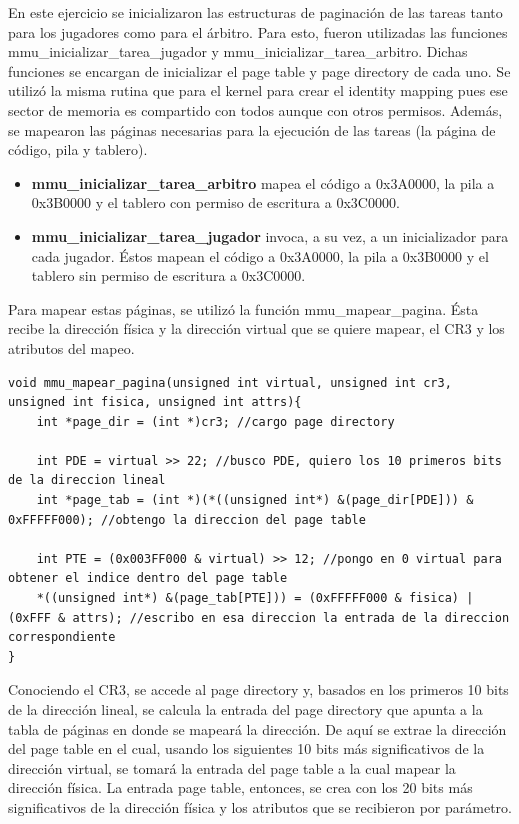\documentclass[10pt, a4paper]{article}
\begin{document}
En este ejercicio se inicializaron las estructuras de paginación de las tareas tanto para los jugadores como para el árbitro. Para esto, fueron utilizadas las funciones mmu\_inicializar\_tarea\_jugador y mmu\_inicializar\_tarea\_arbitro. Dichas funciones se encargan de inicializar el page table y page directory de cada uno. Se utilizó la misma rutina que para el kernel para crear el identity mapping pues ese sector de memoria es compartido con todos aunque con otros permisos. Además, se mapearon las páginas necesarias para la ejecución de las tareas (la página de código, pila y tablero).\newline
\begin{itemize}
\item \textbf{mmu\_inicializar\_tarea\_arbitro} mapea el código a 0x3A0000, la pila a 0x3B0000 y el tablero con permiso de escritura a 0x3C0000.
\item \textbf{mmu\_inicializar\_tarea\_jugador} invoca, a su vez, a un inicializador para cada jugador. Éstos mapean el código a 0x3A0000, la pila a 0x3B0000 y el tablero sin permiso de escritura a 0x3C0000.
\end{itemize}

Para mapear estas páginas, se utilizó la función mmu\_mapear\_pagina. Ésta recibe la dirección física y la dirección virtual que se quiere mapear, el CR3 y los atributos del mapeo.

\begin{center}
		\begin{verbatim}
void mmu_mapear_pagina(unsigned int virtual, unsigned int cr3, unsigned int fisica, unsigned int attrs){
	int *page_dir = (int *)cr3; //cargo page directory
	
	int PDE = virtual >> 22; //busco PDE, quiero los 10 primeros bits de la direccion lineal
	int *page_tab = (int *)(*((unsigned int*) &(page_dir[PDE])) & 0xFFFFF000); //obtengo la direccion del page table
	
	int PTE = (0x003FF000 & virtual) >> 12; //pongo en 0 virtual para obtener el indice dentro del page table
	*((unsigned int*) &(page_tab[PTE])) = (0xFFFFF000 & fisica) | (0xFFF & attrs); //escribo en esa direccion la entrada de la direccion correspondiente
}
	\end{verbatim}
\end{center}

Conociendo el CR3, se accede al page directory y, basados en los primeros 10 bits de la dirección lineal, se calcula la entrada del page directory que apunta a la tabla de páginas en donde se mapeará la dirección. De aquí se extrae la dirección del page table en el cual, usando los siguientes 10 bits más significativos de la dirección virtual, se tomará la entrada del page table a la cual mapear la dirección física. La entrada page table, entonces, se crea con los 20 bits más significativos de la dirección física y los atributos que se recibieron por parámetro.
\end{document}
